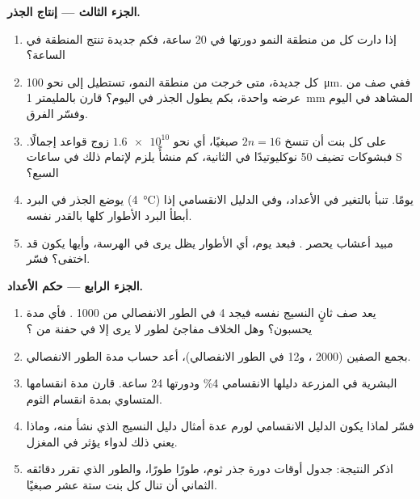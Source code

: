 \begin{problem}
\medskip
\noindent\textbf{الجزء الثالث --- إنتاج الجذر.}
\begin{enumerate}[resume]
  \item إذا دارت كل  من منطقة النمو دورتها في 20 ساعة، فكم 
        جديدة تنتج المنطقة في الساعة؟
  \item كل  جديدة، متى خرجت من منطقة النمو، تستطيل إلى نحو
        \qty{100}{\micro m}. ففي صف من  عرضه  واحدة، بكم
        يطول الجذر في اليوم؟ قارن بالمليمتر \qty{1}{mm} المشاهد في
        اليوم وفسّر الفرق.
  \item على كل  بنت أن تنسخ $2n = 16$ صبغيًا، أي نحو
        $\num{1.6e10}$ زوج قواعد إجمالًا. فبشوكات تضيف 50 نوكليوتيدًا
        في الثانية، كم منشأً يلزم لإتمام ذلك في ساعات S السبع؟
  \item يوضع الجذر في البرد (\qty{4}{\celsius}) يومًا. تنبأ بالتغير في
        الأعداد، وفي الدليل الانقسامي إذا أبطأ البرد الأطوار كلها
        بالقدر نفسه.
  \item مبيد أعشاب يحصر . فبعد يوم، أي الأطوار يظل يرى في
        الهرسة، وأيها يكون قد اختفى؟ فسّر.
\end{enumerate}

\medskip
\noindent\textbf{الجزء الرابع --- حكم الأعداد.}
\begin{enumerate}[resume]
  \item يعد صف ثانٍ النسيج نفسه فيجد 4  في الطور الانفصالي من
        1000 . فأي مدة يحسبون؟ وهل الخلاف مفاجئ لطور لا يرى إلا في
        حفنة من ؟
  \item بجمع الصفين (2000 ، و12 في الطور الانفصالي)، أعد حساب مدة
        الطور الانفصالي.
  \item {} البشرية في المزرعة دليلها الانقسامي 4\% ودورتها 24
        ساعة. قارن مدة انقسامها المتساوي بمدة انقسام الثوم.
  \item فسّر لماذا يكون الدليل الانقسامي لورم عدة أمثال دليل النسيج
        الذي نشأ منه، وماذا يعني ذلك لدواء يؤثر في المغزل.
  \item اذكر النتيجة: جدول أوقات دورة  جذر ثوم، طورًا طورًا،
        والطور الذي تقرر دقائقه الثماني أن تنال كل بنت ستة عشر صبغيًا.
\end{enumerate}
\end{problem}
